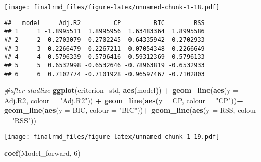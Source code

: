 \documentclass[
]{article}
\newenvironment{Shaded}{\begin{snugshade}}{\end{snugshade}}
\newcommand{\AttributeTok}[1]{\textcolor[rgb]{0.13,0.29,0.53}{#1}}
\newcommand{\CommentTok}[1]{\textcolor[rgb]{0.56,0.35,0.01}{\textit{#1}}}
\newcommand{\DecValTok}[1]{\textcolor[rgb]{0.00,0.00,0.81}{#1}}
\newcommand{\FunctionTok}[1]{\textcolor[rgb]{0.13,0.29,0.53}{\textbf{#1}}}
\newcommand{\NormalTok}[1]{#1}
\newcommand{\OtherTok}[1]{\textcolor[rgb]{0.56,0.35,0.01}{#1}}
\newcommand{\SpecialCharTok}[1]{\textcolor[rgb]{0.81,0.36,0.00}{\textbf{#1}}}
\newcommand{\StringTok}[1]{\textcolor[rgb]{0.31,0.60,0.02}{#1}}
\begin{document}
\texttt{[image: finalrmd\_files/figure-latex/unnamed-chunk-1-18.pdf]}

\begin{Shaded}
\end{Shaded}

\begin{verbatim}
##   model     Adj.R2         CP         BIC        RSS
## 1     1 -1.8995511  1.8995956  1.63483364  1.8995586
## 2     2 -0.2703079  0.2702245  0.64335942  0.2702933
## 3     3  0.2266479 -0.2267211  0.07054348 -0.2266649
## 4     4  0.5796339 -0.5796416 -0.59312369 -0.5796133
## 5     5  0.6532998 -0.6532646 -0.78963819 -0.6532933
## 6     6  0.7102774 -0.7101928 -0.96597467 -0.7102803
\end{verbatim}

\begin{Shaded}
\begin{Highlighting}[]
\CommentTok{\#after stadlize}
\FunctionTok{ggplot}\NormalTok{(criterion\_std, }\FunctionTok{aes}\NormalTok{(model)) }\SpecialCharTok{+}
 \FunctionTok{geom\_line}\NormalTok{(}\FunctionTok{aes}\NormalTok{(}\AttributeTok{y =}\NormalTok{ Adj.R2, }\AttributeTok{colour =} \StringTok{"Adj.R2"}\NormalTok{)) }\SpecialCharTok{+}
 \FunctionTok{geom\_line}\NormalTok{(}\FunctionTok{aes}\NormalTok{(}\AttributeTok{y =}\NormalTok{ CP, }\AttributeTok{colour =} \StringTok{"CP"}\NormalTok{))}\SpecialCharTok{+}
 \FunctionTok{geom\_line}\NormalTok{(}\FunctionTok{aes}\NormalTok{(}\AttributeTok{y =}\NormalTok{ BIC, }\AttributeTok{colour =} \StringTok{"BIC"}\NormalTok{))}\SpecialCharTok{+}
 \FunctionTok{geom\_line}\NormalTok{(}\FunctionTok{aes}\NormalTok{(}\AttributeTok{y =}\NormalTok{ RSS, }\AttributeTok{colour =} \StringTok{"RSS"}\NormalTok{))}
\end{Highlighting}
\end{Shaded}

\texttt{[image: finalrmd\_files/figure-latex/unnamed-chunk-1-19.pdf]}

\begin{Shaded}
\begin{Highlighting}[]
\FunctionTok{coef}\NormalTok{(Model\_forward, }\DecValTok{6}\NormalTok{)}
\end{Highlighting}
\end{Shaded}
\end{document}

